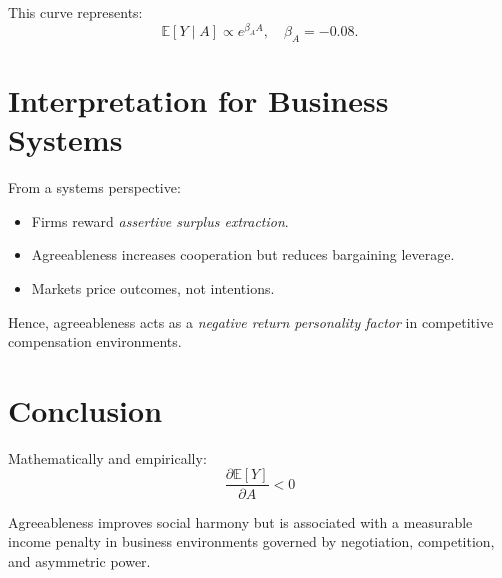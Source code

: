 \documentclass[11pt]{article}
\begin{document}
This curve represents:
\[
\mathbb{E}[Y \mid A] \propto e^{\beta_A A},
\quad \beta_A = -0.08.
\]

\section{Interpretation for Business Systems}

From a systems perspective:
\begin{itemize}
  \item Firms reward \emph{assertive surplus extraction}.
  \item Agreeableness increases cooperation but reduces bargaining leverage.
  \item Markets price outcomes, not intentions.
\end{itemize}

Hence, agreeableness acts as a \emph{negative return personality factor}
in competitive compensation environments.

\section{Conclusion}

Mathematically and empirically:
\[
\boxed{\; \frac{\partial \mathbb{E}[Y]}{\partial A} < 0 \;}
\]

Agreeableness improves social harmony but is associated with a measurable income penalty in
business environments governed by negotiation, competition, and asymmetric power.
\end{document}
